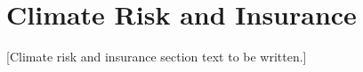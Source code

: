 
\section{Climate Risk and Insurance}
\label{sec:climate}


[Climate risk and insurance section text to be written.]
